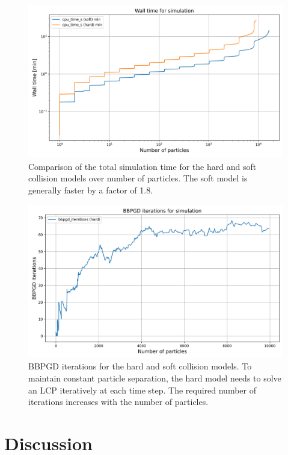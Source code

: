 \documentclass[conference]{IEEEtran}
\begin{document}
\begin{figure}
    \centering
    \includegraphics[width=\linewidth]{figures/comparisons/wall_time_simulation.png}
    \caption{Comparison of the total simulation time for the hard and soft collision models over number of particles. The soft model is generally faster by a factor of 1.8.}
    \label{figure:wall_time_simulation}
\end{figure}

\begin{figure}
    \centering
    \includegraphics[width=\linewidth]{figures/comparisons/bbpgd_iterations_simulation.png}
    \caption{BBPGD iterations for the hard and soft collision models. To maintain constant particle separation, the hard model needs to solve an LCP iteratively at each time step. The required number of iterations increases with the number of particles.}
    \label{figure:bbpgd_iterations_simulation}
\end{figure}

\newpage
\section{Discussion}
\end{document}
